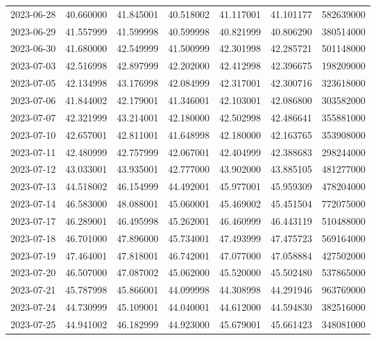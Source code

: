 \begin{tabular}{lrrrrrr}
2023-06-28 &   40.660000 &   41.845001 &   40.518002 &   41.117001 &   41.101177 &   582639000 \\
2023-06-29 &   41.557999 &   41.599998 &   40.599998 &   40.821999 &   40.806290 &   380514000 \\
2023-06-30 &   41.680000 &   42.549999 &   41.500999 &   42.301998 &   42.285721 &   501148000 \\
2023-07-03 &   42.516998 &   42.897999 &   42.202000 &   42.412998 &   42.396675 &   198209000 \\
2023-07-05 &   42.134998 &   43.176998 &   42.084999 &   42.317001 &   42.300716 &   323618000 \\
2023-07-06 &   41.844002 &   42.179001 &   41.346001 &   42.103001 &   42.086800 &   303582000 \\
2023-07-07 &   42.321999 &   43.214001 &   42.180000 &   42.502998 &   42.486641 &   355881000 \\
2023-07-10 &   42.657001 &   42.811001 &   41.648998 &   42.180000 &   42.163765 &   353908000 \\
2023-07-11 &   42.480999 &   42.757999 &   42.067001 &   42.404999 &   42.388683 &   298244000 \\
2023-07-12 &   43.033001 &   43.935001 &   42.777000 &   43.902000 &   43.885105 &   481277000 \\
2023-07-13 &   44.518002 &   46.154999 &   44.492001 &   45.977001 &   45.959309 &   478204000 \\
2023-07-14 &   46.583000 &   48.088001 &   45.060001 &   45.469002 &   45.451504 &   772075000 \\
2023-07-17 &   46.289001 &   46.495998 &   45.262001 &   46.460999 &   46.443119 &   510488000 \\
2023-07-18 &   46.701000 &   47.896000 &   45.734001 &   47.493999 &   47.475723 &   569164000 \\
2023-07-19 &   47.464001 &   47.818001 &   46.742001 &   47.077000 &   47.058884 &   427502000 \\
2023-07-20 &   46.507000 &   47.087002 &   45.062000 &   45.520000 &   45.502480 &   537865000 \\
2023-07-21 &   45.787998 &   45.866001 &   44.099998 &   44.308998 &   44.291946 &   963769000 \\
2023-07-24 &   44.730999 &   45.109001 &   44.040001 &   44.612000 &   44.594830 &   382516000 \\
2023-07-25 &   44.941002 &   46.182999 &   44.923000 &   45.679001 &   45.661423 &   348081000 \\

\end{tabular}
